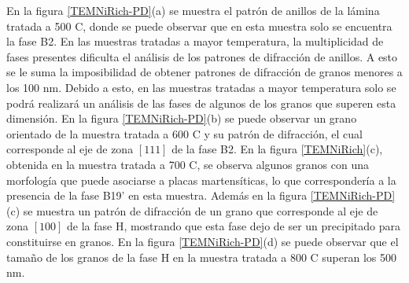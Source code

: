 \documentclass[12pt]{article}
\theoremstyle{definition}
\theoremstyle{remark}
\begin{document}
{En la figura \ref{TEMNiRich-PD}(a) se muestra el patrón de anillos de la lámina tratada a 500 \textdegree C, donde se puede observar que en esta muestra solo se encuentra la fase B2. En las muestras tratadas a mayor temperatura, la multiplicidad de fases presentes dificulta el análisis de los patrones de difracción de anillos. A esto se le suma la imposibilidad de obtener patrones de difracción de granos menores a los 100 nm. Debido a esto, en las muestras tratadas a mayor temperatura solo se podrá realizará un análisis de las fases de algunos de los granos que superen esta dimensión. En la figura \ref{TEMNiRich-PD}(b) se puede observar un grano orientado de la muestra tratada a 600 \textdegree C y su patrón de difracción, el cual corresponde al eje de zona $[111]$ de la fase B2. En la figura \ref{TEMNiRich}(c), obtenida en la muestra tratada a 700 \textdegree C, se observa algunos granos con una morfología que puede asociarse a placas martensíticas, lo que correspondería a la presencia de la fase B19' en esta muestra. Además en la figura \ref{TEMNiRich-PD}(c) se muestra un patrón de difracción de un grano que corresponde al eje de zona $[100]$  de la fase H, mostrando que esta fase dejo de ser un precipitado para constituirse en granos. En la figura \ref{TEMNiRich-PD}(d) se puede observar que el tamaño de los granos de la fase H en la muestra tratada a 800 \textdegree C superan los 500 nm.

}
\end{document}
